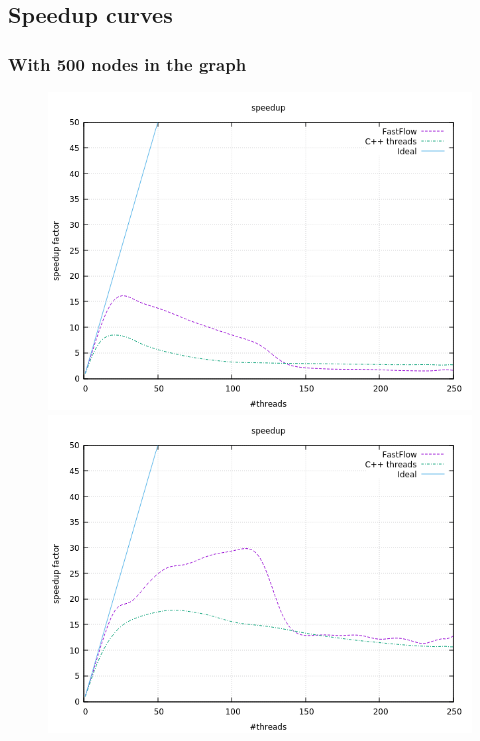 \documentclass[a4paper,10pt]{article}
\begin{document}
	\subsection{Speedup curves}
		\subsubsection{With 500 nodes in the graph}
			\begin{figure}[H]
			\centering
			\begin{minipage}[t]{0.32\linewidth}
				\includegraphics[width=\linewidth]{BenchMarkTSP/speedup/500/SU500500_zoom.png}
				\subcaption{}
			\end{minipage}%
			\begin{minipage}[t]{0.32\linewidth}
				\includegraphics[width=\linewidth]{BenchMarkTSP/speedup/500/SU5005000_zoom.png}

\end{minipage}
\end{figure}
\end{document}
